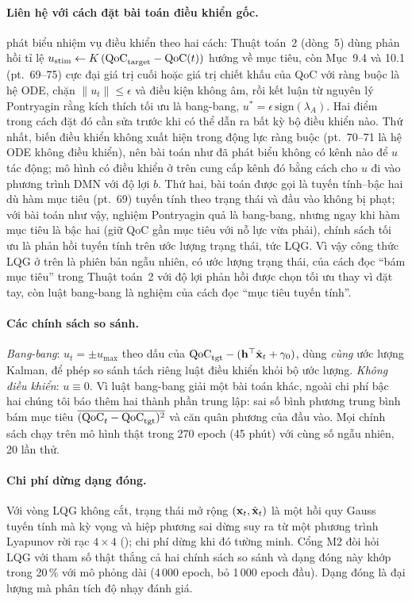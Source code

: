 \paragraph{Liên hệ với cách đặt bài toán điều khiển gốc.} \citet{BQI} phát biểu nhiệm vụ điều khiển theo hai cách: Thuật toán~2 (dòng~5) dùng phản hồi tỉ lệ $u_{\mathrm{stim}}\leftarrow K\,(\mathrm{QoC}_{\mathrm{target}}-\mathrm{QoC}(t))$ hướng về mục tiêu, còn Mục~9.4 và 10.1 (pt.~69--75) cực đại giá trị cuối hoặc giá trị chiết khấu của QoC với ràng buộc là hệ ODE, chặn $\|u_t\|\le\epsilon$ và điều kiện không âm, rồi kết luận từ nguyên lý Pontryagin rằng kích thích tối ưu là bang-bang, $u^*=\epsilon\,\mathrm{sign}(\lambda_A)$. Hai điểm trong cách đặt đó cần sửa trước khi có thể dẫn ra bất kỳ bộ điều khiển nào. Thứ nhất, biến điều khiển không xuất hiện trong động lực ràng buộc (pt.~70--71 là hệ ODE không điều khiển), nên bài toán như đã phát biểu không có kênh nào để $u$ tác động; mô hình có điều khiển ở trên cung cấp kênh đó bằng cách cho $u$ đi vào phương trình DMN với độ lợi $b$. Thứ hai, bài toán được gọi là tuyến tính--bậc hai dù hàm mục tiêu (pt.~69) tuyến tính theo trạng thái và đầu vào không bị phạt; với bài toán như vậy, nghiệm Pontryagin quả là bang-bang, nhưng ngay khi hàm mục tiêu là bậc hai (giữ QoC gần mục tiêu với nỗ lực vừa phải), chính sách tối ưu là phản hồi tuyến tính trên ước lượng trạng thái, tức LQG. Vì vậy công thức LQG ở trên là phiên bản ngẫu nhiên, có ước lượng trạng thái, của cách đọc ``bám mục tiêu'' trong Thuật toán~2 với độ lợi phản hồi được chọn tối ưu thay vì đặt tay, còn luật bang-bang là nghiệm của cách đọc ``mục tiêu tuyến tính''.

\paragraph{Các chính sách so sánh.} \emph{Bang-bang}: $u_t=\pm u_{\max}$ theo dấu của $\mathrm{QoC}_{\mathrm{tgt}}-(\mathbf{h}^\top\hat{\mathbf{x}}_t+\gamma_0)$, dùng \emph{cùng} ước lượng Kalman, để phép so sánh tách riêng luật điều khiển khỏi bộ ước lượng. \emph{Không điều khiển}: $u\equiv0$. Vì luật bang-bang giải một bài toán khác, ngoài chi phí bậc hai chúng tôi báo thêm hai thành phần trung lập: sai số bình phương trung bình bám mục tiêu $\overline{(\mathrm{QoC}_t-\mathrm{QoC}_{\mathrm{tgt}})^2}$ và căn quân phương của đầu vào. Mọi chính sách chạy trên mô hình thật trong 270 epoch (45 phút) với cùng số ngẫu nhiên, 20 lần thử.

\paragraph{Chi phí dừng dạng đóng.} Với vòng LQG không cắt, trạng thái mở rộng $(\mathbf{x}_t,\hat{\mathbf{x}}_t)$ là một hồi quy Gauss tuyến tính mà kỳ vọng và hiệp phương sai dừng suy ra từ một phương trình Lyapunov rời rạc $4\times4$ (); chi phí dừng khi đó tường minh. Cổng M2 đòi hỏi LQG với tham số thật thắng cả hai chính sách so sánh và dạng đóng này khớp trong 20\,\% với mô phỏng dài (4\,000 epoch, bỏ 1\,000 epoch đầu). Dạng đóng là đại lượng mà phân tích độ nhạy đánh giá.

